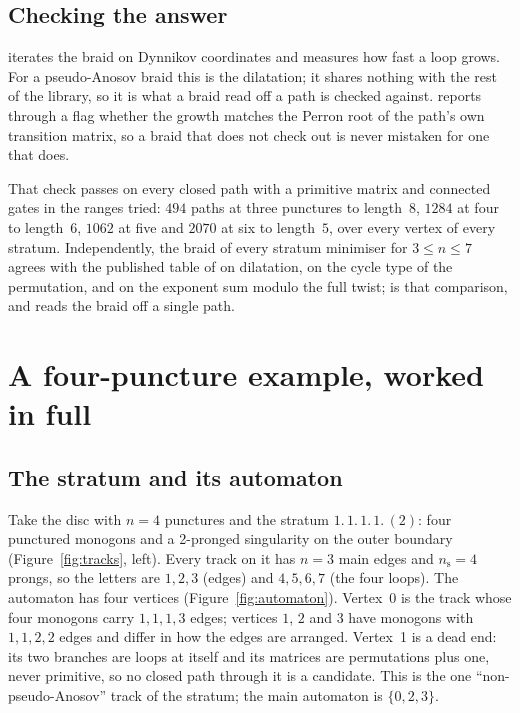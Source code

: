 \documentclass[12pt]{amsart}
\newcommand{\np}{n}                       %
\newcommand{\set}[1]{\{#1\}}
\theoremstyle{plain}
\theoremstyle{definition}
\begin{document}
\subsection{Checking the answer}
 iterates the braid on Dynnikov coordinates and
measures how fast a loop grows.  For a pseudo-Anosov braid this is the
dilatation; it shares nothing with the rest of the library, so it is what
a braid read off a path is checked against.
 reports through a  flag
whether the growth matches the Perron root of the path's own transition
matrix, so a braid that does not check out is never mistaken for one that
does.

That check passes on every closed path with a primitive matrix and
connected gates in the ranges tried: $494$ paths at three punctures to
length~$8$, $1284$ at four to length~$6$, $1062$ at five and $2070$ at
six to length~$5$, over every vertex of every stratum.  Independently,
the braid of every stratum minimiser for $3 \le \np \le 7$ agrees with
the published table of \cite{Lanneau2011b} on dilatation, on the cycle
type of the permutation, and on the exponent sum modulo the full twist;
 is that comparison, and
 reads the braid off a single path.

\section{A four-puncture example, worked in full}
\label{sec:example}

\subsection{The stratum and its automaton}
Take the disc with $\np=4$ punctures and the stratum $1.\,1.\,1.\,1.\,(2)$:
four punctured monogons and a 2-pronged singularity on the outer
boundary (Figure~\ref{fig:tracks}, left).
Every track on it has $n=3$ main edges and $n_{\mathrm{s}}=4$ prongs, so
the letters are $1,2,3$ (edges) and $4,5,6,7$ (the four loops).  The
automaton has four vertices (Figure~\ref{fig:automaton}).  Vertex~0 is
the track whose four monogons carry $1,1,1,3$ edges; vertices $1$, $2$
and $3$ have monogons with $1,1,2,2$ edges and differ in how the edges
are arranged.  Vertex~1 is a dead end: its two branches are loops at
itself and its matrices are permutations plus one, never primitive, so
no closed path through it is a candidate.  This is the one
``non-pseudo-Anosov'' track of the stratum; the main automaton is
$\set{0,2,3}$.
\end{document}
